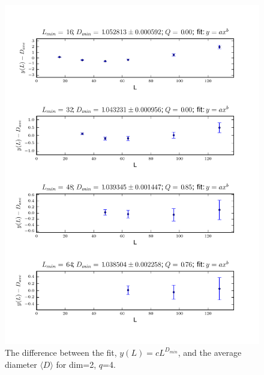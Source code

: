 \documentclass[pre,preprint]{revtex4}
\newcommand{\lb}{{\langle}}
\newcommand{\rb}{{\rangle}}
\begin{document}
\begin{figure}[htp]
\centering
\includegraphics[width=.85\textwidth]{figures/D_min_D2q4_46_fig}
\caption{The difference between the fit, $y(L)=cL^{D_{min}}$, and the average diameter $\lb D \rb$ for dim=2, $q$=4.}\label{fig:4}
\end{figure}

\end{document}
